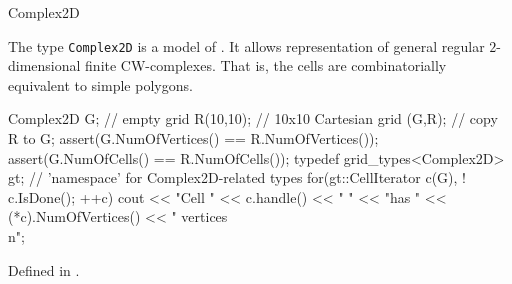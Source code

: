 \begin{Label}{Complex2D}
\end{Label}


The type {\tt Complex2D} is a model of .
It allows representation of  general regular $2$-dimensional finite CW-complexes.
That is, the cells are combinatorially equivalent to  simple polygons.


\begin{example}
Complex2D G;         // empty grid
 R(10,10);  // 10x10 Cartesian grid
(G,R); // copy R to G;
assert(G.NumOfVertices() == R.NumOfVertices());
assert(G.NumOfCells()    == R.NumOfCells());
typedef grid\_types<Complex2D> gt; // 'namespace' for Complex2D-related types 
for(gt::CellIterator c(G), ! c.IsDone(); ++c)
  cout << "Cell " << c.handle() << "  "
       << "has "  << (*c).NumOfVertices() << " vertices\\n";
\end{example}


Defined in .
  
\\
\\
\\
\\

